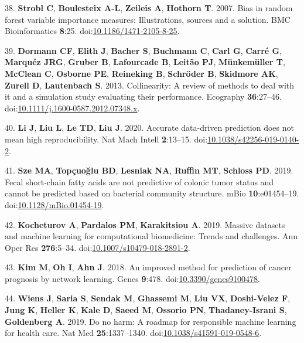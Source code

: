 \documentclass[
  11pt,
]{article}
\begin{document}
\leavevmode\hypertarget{ref-strobl_bias_2007}{}%
38. \textbf{Strobl C}, \textbf{Boulesteix A-L}, \textbf{Zeileis A},
\textbf{Hothorn T}. 2007. Bias in random forest variable importance
measures: Illustrations, sources and a solution. BMC Bioinformatics
\textbf{8}:25.
doi:\href{https://doi.org/10.1186/1471-2105-8-25}{10.1186/1471-2105-8-25}.

\leavevmode\hypertarget{ref-dormann_collinearity:_2013}{}%
39. \textbf{Dormann CF}, \textbf{Elith J}, \textbf{Bacher S},
\textbf{Buchmann C}, \textbf{Carl G}, \textbf{Carré G}, \textbf{Marquéz
JRG}, \textbf{Gruber B}, \textbf{Lafourcade B}, \textbf{Leitão PJ},
\textbf{Münkemüller T}, \textbf{McClean C}, \textbf{Osborne PE},
\textbf{Reineking B}, \textbf{Schröder B}, \textbf{Skidmore AK},
\textbf{Zurell D}, \textbf{Lautenbach S}. 2013. Collinearity: A review
of methods to deal with it and a simulation study evaluating their
performance. Ecography \textbf{36}:27--46.
doi:\href{https://doi.org/10.1111/j.1600-0587.2012.07348.x}{10.1111/j.1600-0587.2012.07348.x}.

\leavevmode\hypertarget{ref-li_accurate_2020}{}%
40. \textbf{Li J}, \textbf{Liu L}, \textbf{Le TD}, \textbf{Liu J}. 2020.
Accurate data-driven prediction does not mean high reproducibility. Nat
Mach Intell \textbf{2}:13--15.
doi:\href{https://doi.org/10.1038/s42256-019-0140-2}{10.1038/s42256-019-0140-2}.

\leavevmode\hypertarget{ref-sze_fecal_2019}{}%
41. \textbf{Sze MA}, \textbf{Topçuoğlu BD}, \textbf{Lesniak NA},
\textbf{Ruffin MT}, \textbf{Schloss PD}. 2019. Fecal short-chain fatty
acids are not predictive of colonic tumor status and cannot be predicted
based on bacterial community structure. mBio \textbf{10}:e01454--19.
doi:\href{https://doi.org/10.1128/mBio.01454-19}{10.1128/mBio.01454-19}.

\leavevmode\hypertarget{ref-kocheturov_massive_2019}{}%
42. \textbf{Kocheturov A}, \textbf{Pardalos PM}, \textbf{Karakitsiou A}.
2019. Massive datasets and machine learning for computational
biomedicine: Trends and challenges. Ann Oper Res \textbf{276}:5--34.
doi:\href{https://doi.org/10.1007/s10479-018-2891-2}{10.1007/s10479-018-2891-2}.

\leavevmode\hypertarget{ref-kim_improved_2018}{}%
43. \textbf{Kim M}, \textbf{Oh I}, \textbf{Ahn J}. 2018. An improved
method for prediction of cancer prognosis by network learning. Genes
\textbf{9}:478.
doi:\href{https://doi.org/10.3390/genes9100478}{10.3390/genes9100478}.

\leavevmode\hypertarget{ref-wiens_no_2019}{}%
44. \textbf{Wiens J}, \textbf{Saria S}, \textbf{Sendak M},
\textbf{Ghassemi M}, \textbf{Liu VX}, \textbf{Doshi-Velez F},
\textbf{Jung K}, \textbf{Heller K}, \textbf{Kale D}, \textbf{Saeed M},
\textbf{Ossorio PN}, \textbf{Thadaney-Israni S}, \textbf{Goldenberg A}.
2019. Do no harm: A roadmap for responsible machine learning for health
care. Nat Med \textbf{25}:1337--1340.
doi:\href{https://doi.org/10.1038/s41591-019-0548-6}{10.1038/s41591-019-0548-6}.
\end{document}
